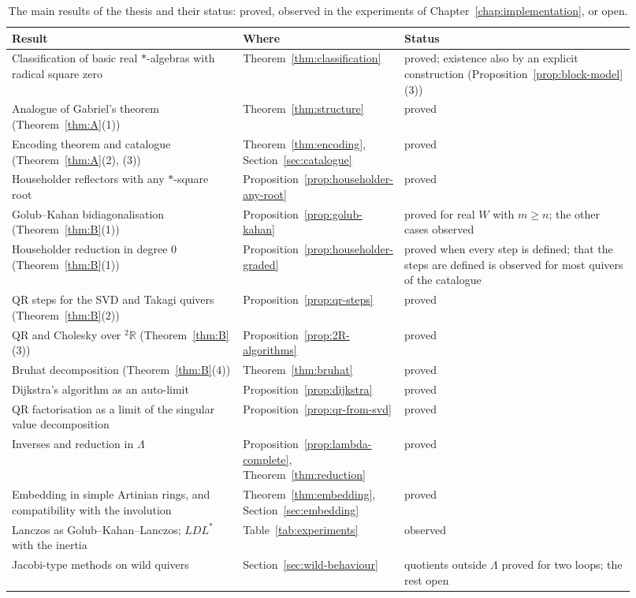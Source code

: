 \documentclass[12pt, a4paper]{report}
\theoremstyle{plain}
\theoremstyle{definition}
\theoremstyle{remark}
\theoremstyle{plain}
\newcommand{\twoR}{{}^{2}\mathbb{R}}
\newcommand{\rowrule}{\arrayrulecolor{black!30}\midrule[0.3pt]\arrayrulecolor{black}}
\begin{document}
\begin{table}[htbp]
\centering
\caption{The main results of the thesis and their status: proved, observed in the experiments of Chapter~\ref{chap:implementation}, or open.}
\label{tab:status}
\small
\renewcommand{\arraystretch}{1.2}
\begin{tabular}{@{}>{\raggedright\arraybackslash}p{0.37\linewidth}>{\raggedright\arraybackslash}p{0.18\linewidth}>{\raggedright\arraybackslash}p{0.37\linewidth}@{}}
\toprule
\textbf{Result} & \textbf{Where} & \textbf{Status} \\
\midrule
Classification of basic real $*$-algebras with radical square zero & Theorem~\ref{thm:classification} & proved; existence also by an explicit construction (Proposition~\ref{prop:block-model}(3)) \\
\rowrule
Analogue of Gabriel's theorem (Theorem~\ref{thm:A}(1)) & Theorem~\ref{thm:structure} & proved \\
\rowrule
Encoding theorem and catalogue (Theorem~\ref{thm:A}(2), (3)) & Theorem~\ref{thm:encoding}, Section~\ref{sec:catalogue} & proved \\
\rowrule
Householder reflectors with any $*$-square root & Proposition~\ref{prop:householder-any-root} & proved \\
\rowrule
Golub--Kahan bidiagonalisation (Theorem~\ref{thm:B}(1)) & Proposition~\ref{prop:golub-kahan} & proved for real $W$ with $m\geq n$; the other cases observed \\
\rowrule
Householder reduction in degree $0$ (Theorem~\ref{thm:B}(1)) & Proposition~\ref{prop:householder-graded} & proved when every step is defined; that the steps are defined is observed for most quivers of the catalogue \\
\rowrule
QR steps for the SVD and Takagi quivers (Theorem~\ref{thm:B}(2)) & Proposition~\ref{prop:qr-steps} & proved \\
\rowrule
QR and Cholesky over $\twoR$ (Theorem~\ref{thm:B}(3)) & Proposition~\ref{prop:2R-algorithms} & proved \\
\rowrule
Bruhat decomposition (Theorem~\ref{thm:B}(4)) & Theorem~\ref{thm:bruhat} & proved \\
\rowrule
Dijkstra's algorithm as an auto-limit & Proposition~\ref{prop:dijkstra} & proved \\
\rowrule
QR factorisation as a limit of the singular value decomposition & Proposition~\ref{prop:qr-from-svd} & proved \\
\rowrule
Inverses and reduction in $\Lambda$ & Proposition~\ref{prop:lambda-complete}, Theorem~\ref{thm:reduction} & proved \\
\rowrule
Embedding in simple Artinian rings, and compatibility with the involution & Theorem~\ref{thm:embedding}, Section~\ref{sec:embedding} & proved \\
\rowrule
Lanczos as \mbox{Golub--Kahan--Lanczos}; $LDL^*$ with the inertia & Table~\ref{tab:experiments} & observed \\
\rowrule
Jacobi-type methods on wild quivers & Section~\ref{sec:wild-behaviour} & quotients outside $\Lambda$ proved for two loops; the rest open \\
\bottomrule
\end{tabular}
\end{table}
\end{document}
